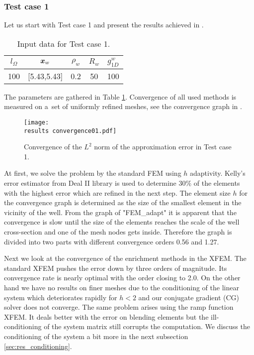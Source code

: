 \subsubsection{Test case 1}
Let us start with Test case 1 and present the results achieved in \cite{exner_2016}.
%
\begin{table}[!htb]
\begin{center}
\begin{tabular}{ccccc}
\toprule
$l_\Omega$ & $\mathbf{\boldsymbol{x}}_w$  & $\rho_w$ & $R_w$ & $g^w_{1D}$\\
\midrule
100 & [5.43,5.43] & 0.2 & 50 & 100 \\
\bottomrule
\end{tabular}
\caption{Input data for Test case 1.}
\label{tab:test_case_1_data}
\end{center}
\end{table}
%
The parameters are gathered in Table \ref{tab:test_case_1_data}.
Convergence of all used methods is measured on a~set of uniformly refined meshes, 
see the convergence graph in .
%
\begin{figure}[!htb]
  \centering    
  \texttt{[image: \\results convergence01.pdf]}
  \caption[Convergence graph in Test case 1]{Convergence of the $L^2$ norm of the approximation error in Test case 1.}
  \label{fig:convergence01}
\end{figure}
%
At first, we solve the problem by the standard FEM using $h$ adaptivity.
Kelly's error estimator from Deal II library is used to determine 30\% of the elements
with the highest error which are refined in the next step.
The element size $h$ for the convergence graph is determined as the size of the smallest element in the 
vicinity of the well.
From the graph of "FEM\_adapt" it is apparent that the convergence is slow until the size of the elements reaches the scale of the
well cross-section and one of the mesh nodes gets inside. 
Therefore the graph is divided into two parts with different convergence orders 0.56 and 1.27.

Next we look at the convergence of the enrichment methods in the XFEM.
The standard XFEM pushes the error down by three orders of magnitude. Its convergence rate is nearly optimal with the order closing to 2.0.
On the other hand we have no results on finer meshes due to the conditioning of the linear system
which deteriorates rapidly for $h<2$ and our conjugate gradient (CG) solver does not converge.
The same problem arises using the ramp function XFEM. It deals better with the error on blending elements but the
ill-conditioning of the system matrix still corrupts the computation. We discuss the conditioning of the system 
a bit more in the next subsection \ref{sec:res_conditioning}.

